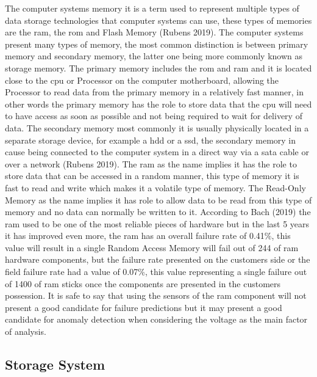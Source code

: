 The computer systems memory it is a term used to represent multiple types of data storage technologies that computer
systems can use, these types of memories are the \acrfull{ram}, the \acrfull{rom} and Flash
Memory (Rubens 2019). The computer systems present many types of memory, the most common distinction is between
primary memory and secondary memory, the latter one being more commonly known as storage memory. The primary
memory includes the \acrfull{rom} and \acrfull{ram} and it is located close to the \acrfull{cpu} or
Processor on the computer motherboard, allowing the Processor to read data from the
primary memory in a relatively fast manner, in other words the primary memory has the role to store data that
the \acrfull{cpu} will need to have access as soon as possible and not being required to wait
for delivery of data. The secondary memory most commonly it is usually physically located in a separate storage
device, for example a \acrfull{hdd} or a \acrfull{ssd}, the secondary memory in cause being
connected to the computer system in a direct way via a \acrfull{sata} cable or
over a network (Rubens 2019). The \acrfull{ram} as the name implies it has the role to store data
that can be accessed in a random manner, this type of memory it is fast to read and write which makes it a
volatile type of memory. The Read-Only Memory as the name implies it has role to allow data to be read from
this type of memory and no data can normally be written to it. According to Bach (2019)  the \acrfull{ram}
used to be one of the most reliable pieces of hardware but in the last 5 years it has improved
even more, the \acrfull{ram} has an overall failure rate of 0.41\%, this value will result in a
single Random Access Memory will fail out of 244 of \acrfull{ram} hardware components, but the
failure rate presented on the customers side or the field failure rate had a value of 0.07\%, this value
representing a single failure out of 1400 of \acrfull{ram} sticks once the components are
presented in the customers possession. It is safe to say that using the sensors of the \acrfull{ram}
component will not present a good candidate for failure predictions but it may present a good candidate
for anomaly detection when considering the voltage as the main factor of analysis.

\newpage

\subsection{Storage System}


